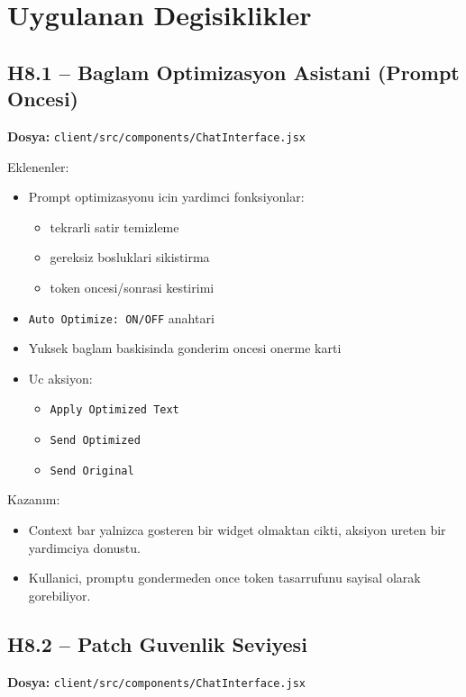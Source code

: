 \documentclass[12pt,a4paper]{article}
\begin{document}
\section{Uygulanan Degisiklikler}

\subsection{H8.1 -- Baglam Optimizasyon Asistani (Prompt Oncesi)}
\textbf{Dosya:} \texttt{client/src/components/ChatInterface.jsx}

Eklenenler:
\begin{itemize}[leftmargin=*]
  \item Prompt optimizasyonu icin yardimci fonksiyonlar:
  \begin{itemize}[leftmargin=*]
    \item tekrarli satir temizleme
    \item gereksiz bosluklari sikistirma
    \item token oncesi/sonrasi kestirimi
  \end{itemize}
  \item \texttt{Auto Optimize: ON/OFF} anahtari
  \item Yuksek baglam baskisinda gonderim oncesi onerme karti
  \item Uc aksiyon:
  \begin{itemize}[leftmargin=*]
    \item \texttt{Apply Optimized Text}
    \item \texttt{Send Optimized}
    \item \texttt{Send Original}
  \end{itemize}
\end{itemize}

Kazan\i m:
\begin{itemize}[leftmargin=*]
  \item Context bar yalnizca gosteren bir widget olmaktan cikti, aksiyon ureten bir yardimciya donustu.
  \item Kullanici, promptu gondermeden once token tasarrufunu sayisal olarak gorebiliyor.
\end{itemize}

\subsection{H8.2 -- Patch Guvenlik Seviyesi}
\textbf{Dosya:} \texttt{client/src/components/ChatInterface.jsx}
\end{document}
